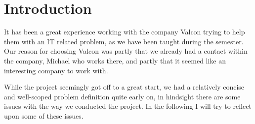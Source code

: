 \section*{Introduction}
It has been a great experience working with the company Valcon trying to help them with an IT related problem, as we have been taught during the semester.
Our reason for choosing Valcon was partly that we already had a contact within the company, Michael who works there, and partly that it seemed like an interesting company to work with.

While the project seemingly got off to a great start, we had a relatively concise and well-scoped problem definition quite early on, in hindsight there are some issues with the way we conducted the project.
In the following I will try to reflect upon some of these issues.